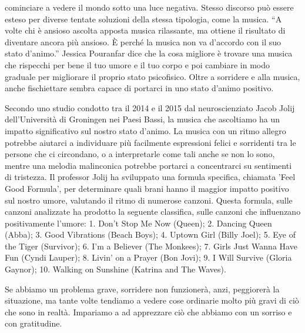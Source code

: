 \documentclass[12pt]{book} %
\begin{document}
cominciare a vedere il mondo sotto una luce negativa. Stesso discorso può essere esteso per diverse tentate soluzioni
della stessa tipologia, come la musica. “A volte chi è ansioso ascolta apposta musica rilassante, ma ottiene il
risultato di diventare ancora più ansioso. È perché la musica non va d'accordo con il suo stato
d'animo.” Jessica Pouranfar dice che la cosa migliore è trovare una musica che rispecchi per bene
il tuo umore e il tuo corpo e poi cambiare in modo graduale per migliorare il proprio stato
psicofisico. 
Oltre a sorridere e alla musica, anche fischiettare sembra capace di portarci in uno stato d'animo positivo.

Secondo uno studio condotto tra il 2014 e il 2015 dal neuroscienziato Jacob Jolij dell'Università di Groningen nei Paesi Bassi, la musica che ascoltiamo ha un impatto significativo sul nostro stato d'animo. La musica con un ritmo allegro potrebbe aiutarci a individuare più facilmente espressioni felici e sorridenti tra le persone che ci circondano, o a interpretarle come tali anche se non lo sono, mentre una melodia malinconica potrebbe portarci a concentrarci su sentimenti di tristezza. Il professor Jolij ha sviluppato una formula specifica, chiamata 'Feel Good Formula', per determinare quali brani hanno il maggior impatto positivo sul nostro umore, valutando il ritmo di numerose canzoni. Questa formula, sulle canzoni analizzate ha prodotto la seguente classifica, sulle canzoni che influenzano positivamente l'umore: 1. Don't Stop Me Now (Queen); 2. Dancing Queen (Abba); 3. Good Vibrations (Beach Boys); 4. Uptown Girl (Billy Joel); 5. Eye of the Tiger (Survivor); 6. I'm a Believer (The Monkees); 7. Girls Just Wanna Have Fun (Cyndi Lauper); 8. Livin' on a Prayer (Bon Jovi); 9. I Will Survive (Gloria Gaynor); 10. Walking on Sunshine (Katrina and The Waves).

Se abbiamo un problema grave, sorridere non funzionerà, anzi, peggiorerà la situazione, ma tante volte tendiamo a vedere
cose ordinarie molto più gravi di ciò che sono in realtà. Impariamo a ad apprezzare ciò che abbiamo con un sorriso e
con gratitudine.
\end{document}
